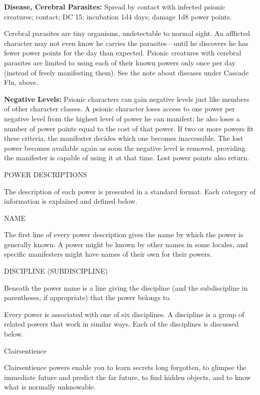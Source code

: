 \documentclass{article}
\begin{document}
\textbf{Disease, Cerebral Parasites:} Spread by contact with infected psionic creatures; 
contact; DC 15; incubation 1d4 days; damage 1d8 power points. 

Cerebral parasites are tiny organisms, undetectable to normal sight. An afflicted 
character may not even know he carries the parasites---until he discovers he has 
fewer power points for the day than expected. Psionic creatures with cerebral parasites 
are limited to using each of their known powers only once per day (instead of freely 
manifesting them). See the note about diseases under Cascade Flu, above.

\textbf{Negative Levels:} Psionic characters can gain negative levels just like 
members of other character classes. A psionic character loses access to one power 
per negative level from the highest level of power he can manifest; he also loses 
a number of power points equal to the cost of that power. If two or more powers 
fit these criteria, the manifester decides which one becomes inaccessible. The 
lost power becomes available again as soon the negative level is removed, providing 
the manifester is capable of using it at that time. Lost power points also return.

\vspace{36pt}
{\LARGE{}POWER DESCRIPTIONS}

The description of each power is presented in a standard format. Each category 
of information is explained and defined below.

\vspace{12pt}
NAME

The first line of every power description gives the name by which the power is 
generally known. A power might be known by other names in some locales, and specific 
manifesters might have names of their own for their powers.

\vspace{12pt}
DISCIPLINE (SUBDISCIPLINE)

Beneath the power name is a line giving the discipline (and the subdiscipline in 
parentheses, if appropriate) that the power belongs to.

Every power is associated with one of six disciplines. A discipline is a group 
of related powers that work in similar ways. Each of the disciplines is discussed 
below.

\vspace{12pt}
Clairsentience

Clairsentience powers enable you to learn secrets long forgotten, to glimpse the 
immediate future and predict the far future, to find hidden objects, and to know 
what is normally unknowable.
\end{document}
